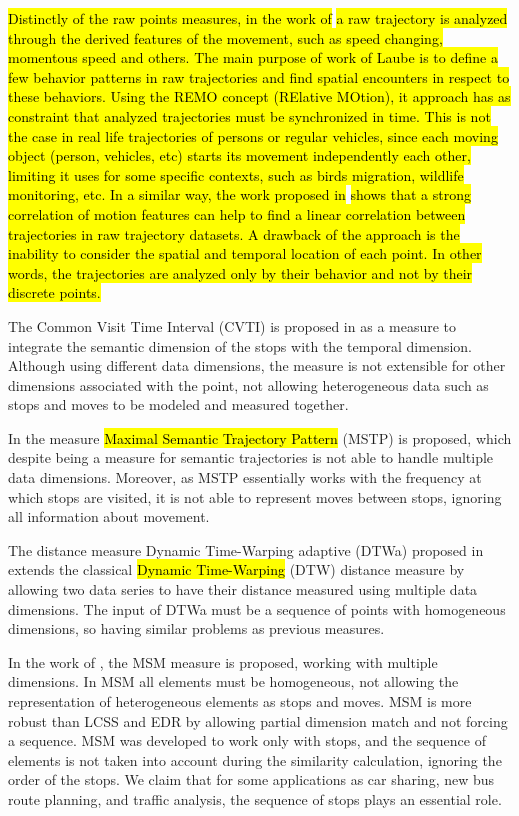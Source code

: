 \documentclass[12pt]{article}
\begin{document}
\hl{Distinctly of the raw points measures, in the work of }\cite{Laube2005}\hl{ a raw trajectory is analyzed through the derived features of the movement, such as speed changing, momentous speed and others. The main purpose of work of Laube is to define a few behavior patterns in raw trajectories and find spatial encounters in respect to these behaviors. Using the REMO concept (RElative MOtion), it approach has as constraint that analyzed trajectories must be synchronized in time. This is not the case in real life trajectories of persons or regular vehicles, since each moving object (person, vehicles, etc) starts its movement independently each other, limiting it uses for some specific contexts, such as birds migration, wildlife monitoring, etc. In a similar way, the work proposed in } \cite{Shirabe2006}\hl{ shows that a strong correlation of motion features can help to find a linear correlation between trajectories in raw trajectory datasets. A drawback of the approach is the inability to consider the spatial and temporal location of each point. In other words, the trajectories are analyzed only by their behavior and not by their discrete points.}

The Common Visit Time Interval (CVTI) is proposed in \cite{Kang:2009:SMT:1529282.1529580} as a measure to integrate the semantic dimension of the stops with the temporal dimension. Although using different data dimensions, the measure is not extensible for other dimensions associated with the point, not allowing heterogeneous data such as stops and moves to be modeled and measured together.

In \cite{Ying:2010:MUS:1867699.1867703} the measure \hl{Maximal Semantic Trajectory Pattern} (MSTP) is proposed, which despite being a measure for semantic trajectories is not able to handle multiple data dimensions. Moreover, as MSTP essentially works with the frequency at which stops are visited, it is not able to represent moves between stops, ignoring all information about movement.

The distance measure Dynamic Time-Warping adaptive (DTWa) proposed in \cite{Shokoohi-Yekta2017} extends the classical \hl{Dynamic Time-Warping} (DTW) \cite{berndt1994using} distance measure by allowing two data series to have their distance measured using multiple data dimensions. The input of DTWa must be a sequence of points with homogeneous dimensions, so having similar problems as previous measures.

In the work of \cite{Furtado:TGIS12156}, the MSM measure is proposed, working with multiple dimensions. In MSM all elements must be homogeneous, not allowing the representation of heterogeneous elements as stops and moves. MSM is more robust than LCSS and EDR by allowing partial dimension match and not forcing a sequence. MSM was developed to work only with stops, and the sequence of elements is not taken into account during the similarity calculation, ignoring the order of the stops. We claim that for some applications as car sharing, new bus route planning, and traffic analysis, the sequence of stops plays an essential role.
\end{document}
